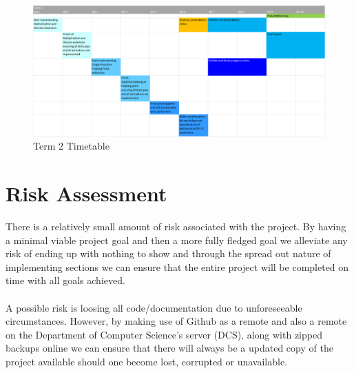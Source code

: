 \documentclass[a4paper,fleqn,12pt]{article}
\begin{document}
\begin{figure}[H]
    \centering
    \includegraphics[angle=90, scale=0.75]{specification/t2.png}
    \caption{Term 2 Timetable}
    \label{fig:timetable_t2}
\end{figure}


\section{Risk Assessment}
There is a relatively small amount of risk associated with the project. By having a minimal viable project goal and then a more fully fledged goal we alleviate any risk of ending up with nothing to show and through the spread out nature of implementing sections we can ensure that the entire project will be completed on time with all goals achieved.
\\\\
A possible risk is loosing all code/documentation due to unforeseeable circumstances. However, by making use of Github as a remote and also a remote on the Department of Computer Science's server (DCS), along with zipped backups online we can ensure that there will always be a updated copy of the project available should one become lost, corrupted or unavailable.
\end{document}
